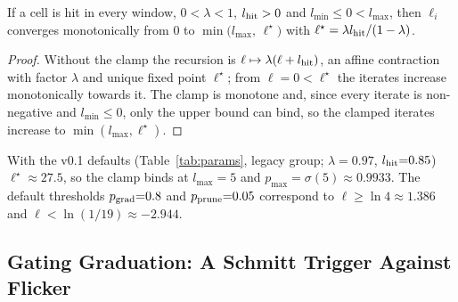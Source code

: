 \begin{proposition}\label{prop:fixedpoint}
If a cell is hit in every window, $0<\lambda<1$, $l_{\mathrm{hit}}>0$ and $l_{\min}\le0<l_{\max}$, then $\ell_i$ converges monotonically from $0$ to $\min\!\big(l_{\max},\,\ell^\star\big)$ with $\ell^\star=\lambda l_{\mathrm{hit}}/(1-\lambda)$.
\end{proposition}
\begin{proof}
Without the clamp the recursion is $\ell\mapsto\lambda(\ell+l_{\mathrm{hit}})$, an affine contraction with factor $\lambda$ and unique fixed point $\ell^\star$; from $\ell=0<\ell^\star$ the iterates increase monotonically towards it. The clamp is monotone and, since every iterate is non-negative and $l_{\min}\le0$, only the upper bound can bind, so the clamped iterates increase to $\min(l_{\max},\ell^\star)$.
\end{proof}
With the v0.1 defaults (Table~\ref{tab:params}, legacy group; $\lambda{=}0.97$, $l_{\mathrm{hit}}{=}0.85$) $\ell^\star\approx 27.5$, so the clamp binds at $l_{\max}{=}5$ and $p_{\max}=\sigma(5)\approx 0.9933$. The default thresholds $p_{\mathrm{grad}}{=}0.8$ and $p_{\mathrm{prune}}{=}0.05$ correspond to $\ell\ge\ln 4\approx 1.386$ and $\ell<\ln(1/19)\approx-2.944$.

\subsection{Gating Graduation: A Schmitt Trigger Against Flicker}\label{subsec:schmitt}

